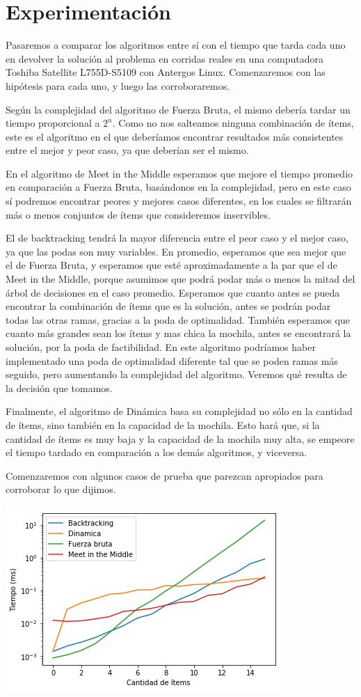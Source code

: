 \documentclass[10pt, a4paper]{article}
\begin{document}
\section{Experimentación}
Pasaremos a comparar los algoritmos entre sí con el tiempo que tarda cada uno en devolver la solución al problema en corridas reales en una computadora Toshiba Satellite L755D-S5109 con Antergos Linux. Comenzaremos con las hipótesis para cada uno, y luego las corroboraremos.\par
Según la complejidad del algoritmo de Fuerza Bruta, el mismo debería tardar un tiempo proporcional a $2^n$. Como no nos salteamos ninguna combinación de ítems, este es el algoritmo en el que deberíamos encontrar resultados más consistentes entre el mejor y peor caso, ya que deberían ser el mismo.\par
En el algoritmo de Meet in the Middle esperamos que mejore el tiempo promedio en comparación a Fuerza Bruta, basándonos en la complejidad, pero en este caso sí podremos encontrar peores y mejores casos diferentes, en los cuales se filtrarán más o menos conjuntos de ítems que consideremos inservibles.\par
El de backtracking tendrá la mayor diferencia entre el peor caso y el mejor caso, ya que las podas son muy variables. En promedio, esperamos que sea mejor que el de Fuerza Bruta, y esperamos que esté aproximadamente a la par que el de Meet in the Middle, porque asumimos que podrá podar más o menos la mitad del árbol de decisiones en el caso promedio. Esperamos que cuanto antes se pueda encontrar la combinación de ítems que es la solución, antes se podrán podar todas las otras ramas, gracias a la poda de optimalidad. También esperamos que cuanto más grandes sean los ítems y mas chica la mochila, antes se encontrará la solución, por la poda de factibilidad. En este algoritmo podríamos haber implementado una poda de optimalidad diferente tal que se poden ramas más seguido, pero aumentando la complejidad del algoritmo. Veremos qué resulta de la decisión que tomamos.\par
Finalmente, el algoritmo de Dinámica basa su complejidad no sólo en la cantidad de ítems, sino también en la capacidad de la mochila. Esto hará que, si la cantidad de ítems es muy baja y la capacidad de la mochila muy alta, se empeore el tiempo tardado en comparación a los demás algoritmos, y viceversa.\par

Comenzaremos con algunos casos de prueba que parezcan apropiados para corroborar lo que dijimos.\par
\includegraphics{capacidad100.png}
\end{document}
